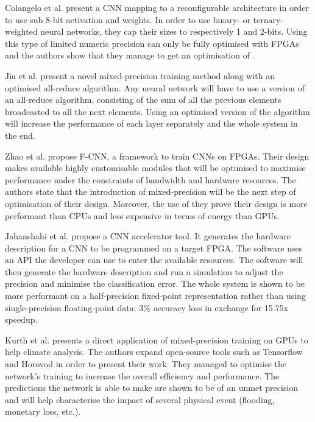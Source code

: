 Colangelo et al. \cite{Colangelo2018} present a CNN mapping to a reconfigurable architecture in order to use sub 8-bit activation and weights. In order to use binary- or ternary-weighted neural networks, they cap their sizes to respectively 1 and 2-bits. Using this type of limited numeric precision can only be fully optimised with FPGAs and the authors show that they manage to get an optimisation of .

Jia et al. \cite{Jia2018} present a novel mixed-precision training method along with an optimised all-reduce algorithm. Any neural network will have to use a version of an all-reduce algorithm, consisting of the sum of all the previous elements broadcasted to all the next elements. Using an optimised version of the algorithm will increase the performance of each layer separately and the whole system in the end.

Zhao et al. \cite{Zhao2016} propose F-CNN, a framework to train CNNs on FPGAs. Their design makes available highly customisable modules that will be optimised to maximise performance under the constraints of bandwidth and hardware resources. The authors state that the introduction of mixed-precision will be the next step of optimisation of their design. Moreover, the use of they prove their design is more performant than CPUs and less expensive in terms of energy than GPUs.

Jahanshahi et al. \cite{Jahanshahi2019} propose a CNN accelerator tool. It generates the hardware description for a CNN to be programmed on a target FPGA. The software uses an API the developer can use to enter the available resources. The software will then generate the hardware description and run a simulation to adjust the precision and minimise the classification error. The whole system is shown to be more performant on a half-precision fixed-point representation rather than using single-precision floating-point data: 3\% accuracy loss in exchange for 15.75x speedup.

Kurth et al. \cite{Kurth2018} presents a direct application of mixed-precision training on GPUs to help climate analysis. The authors expand open-source tools such as Tensorflow and Horovod in order to present their work. They managed to optimise the network's training to increase the overall efficiency and performance. The predictions the network is able to make are shown to be of an unmet precision and will help characterise the impact of several physical event (flooding, monetary loss, etc.).

